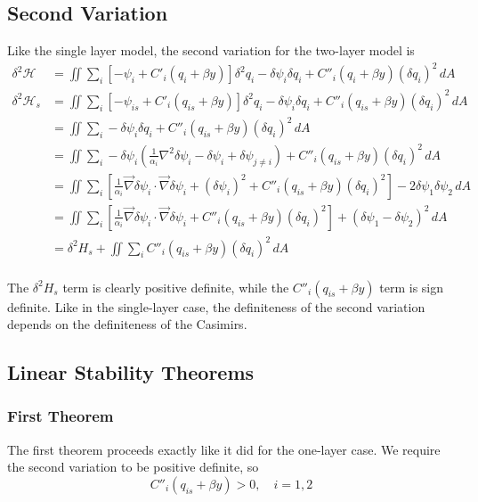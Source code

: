 \documentclass[12pt]{article}
\begin{document}
{    \subsection{Second Variation}{
        Like the single layer model, the second variation for the two-layer model is
        \begin{align*}
            \delta^2 \mathcal{H} &= \iint \sum_i \left[ - \psi_i + C'_i(q_i + \beta y) \right]  \delta^2 q_i  - \delta \psi_i \delta q_i +  C''_i(q_i + \beta y) (\delta q_i)^2  \, dA \\
            \delta^2 \mathcal{H}_s &= \iint \sum_i \left[ - \psi_{is} + C'_i(q_{is} + \beta y) \right]  \delta^2 q_i  - \delta \psi_i \delta q_i +  C''_i(q_{is} + \beta y) (\delta q_i)^2  \, dA \\
            &= \iint \sum_i - \delta \psi_i \delta q_i +  C''_i(q_{is} + \beta y) (\delta q_i)^2  \, dA \\
            &= \iint \sum_i - \delta \psi_i \left( \frac{1}{\alpha_i} \nabla^2 \delta \psi_i - \delta\psi_i + \delta\psi_{j \ne i} \right) +  C''_i(q_{is} + \beta y) (\delta q_i)^2  \, dA \\
            &= \iint \sum_i \left[ \frac{1}{\alpha_i} \vec\nabla\delta\psi_i \cdot \vec\nabla\delta\psi_i + (\delta\psi_i)^2 + C''_i(q_{is} + \beta y) (\delta q_i)^2 \right]  - 2\delta\psi_1\delta\psi_2 \, dA \\
            &= \iint \sum_i \left[ \frac{1}{\alpha_i} \vec\nabla\delta\psi_i \cdot \vec\nabla\delta\psi_i + C''_i(q_{is} + \beta y) (\delta q_i)^2 \right]+ (\delta\psi_1 - \delta\psi_2)^2 \, dA \\
            &= \delta^2 H_s + \iint \sum_i C''_i(q_{is} + \beta y)(\delta q_i)^2 \, dA \\
        \end{align*}

        The $\delta^2 H_s$ term is clearly positive definite, while the $C''_i(q_{is} + \beta y)$ term is sign definite. Like in the single-layer case, the definiteness of the second variation depends on the definiteness of the Casimirs.
    }

    \subsection{Linear Stability Theorems}{
        \subsubsection{First Theorem}{
            The first theorem proceeds exactly like it did for the one-layer case. We require the second variation to be positive definite, so
            $$
            C''_i(q_{is} + \beta y) > 0, \quad i=1,2
            $$

}}}
\end{document}
